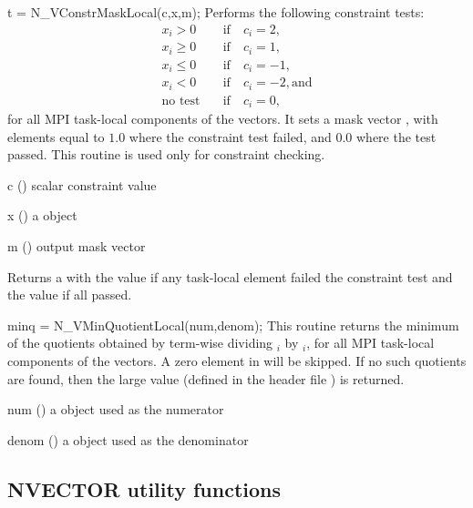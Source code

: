 {
  t = N\_VConstrMaskLocal(c,x,m);
}
{
  Performs the following constraint tests:
  {\begin{align*}
  x_i > 0        & \quad \text{if} \quad c_i=2, \\
  x_i \ge 0      & \quad \text{if} \quad c_i=1, \\
  x_i \le 0      & \quad \text{if} \quad c_i=-1, \\
  x_i < 0        & \quad \text{if} \quad c_i=-2, \text{and} \\
  \text{no test} & \quad \text{if} \quad c_i=0,
  \end{align*}}%
  for all MPI task-local components of the vectors.
  It sets a mask vector , with elements equal to $1.0$ where
  the constraint test failed, and $0.0$ where the test passed. This
  routine is used only for constraint checking.
}
{
  \begin{args}[c]
  \item[c] () scalar constraint value
  \item[x] () a {\nvector} object
  \item[m] () output mask vector
  \end{args}
}
{
  Returns a  with the value  if any
  task-local element failed the constraint test and the value
   if all passed.
}
{}

{
  minq = N\_VMinQuotientLocal(num,denom);
}
{
  This routine returns the minimum of the quotients obtained
  by term-wise dividing $_i$ by $_i$, for all MPI
  task-local components of the vectors.  A zero element in 
  will be skipped. If no such quotients are found, then the large value
   (defined in the header file )
  is returned.
}
{
  \begin{args}[x]
  \item[num] () a {\nvector} object used as the numerator
  \item[denom] () a {\nvector} object used as the denominator
  \end{args}
}
{
}
{}


\subsection{NVECTOR utility functions}\label{ss:nvecutils}


